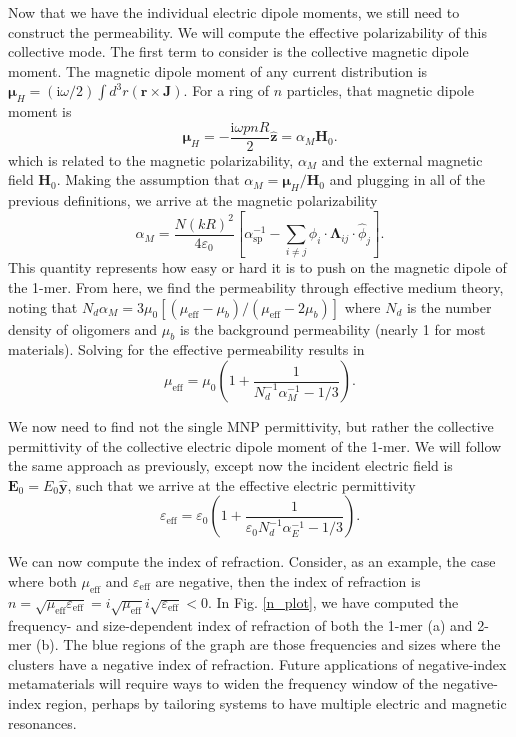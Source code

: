 \documentclass [11pt, proquest] {uwthesis}[2016/11/22]
\begin{document}
Now that we have the individual electric dipole moments, we still need to construct the permeability. We will compute the effective polarizability of this collective mode. The first term to consider is the collective magnetic dipole moment. The magnetic dipole moment of any current distribution is $\boldsymbol{\mu}_H = (\textrm{i}\omega/2)\int d^3r(\textbf{r}\times\textbf{J})$. For a ring of $n$ particles, that magnetic dipole moment is
\begin{equation}
\boldsymbol{\mu}_H = -\frac{\textrm{i}\omega pnR}{2}\hat{\textbf{z}} = \alpha_{M}\textbf{H}_0.
\label{mag_dip_1}
\end{equation}
which is related to the magnetic polarizability, $\alpha_M$ and the external magnetic field $\textbf{H}_0$. Making the assumption that $\alpha_M = \boldsymbol{\mu}_H/\textbf{H}_0$ and plugging in all of the previous definitions, we arrive at the magnetic polarizability
\begin{equation}
\alpha_M = \frac{N(kR)^2}{4\varepsilon_0}\left[\alpha_{\textrm{sp}}^{-1} - \sum_{i\neq j} \hat{\phi}_i\cdot\boldsymbol{\Lambda}_{ij}\cdot\hat{\phi}_j\right].
\label{alpha_mag}
\end{equation}
This quantity represents how easy or hard it is to push on the magnetic dipole of the 1-mer. From here, we find the permeability through effective medium theory, noting that $N_d\alpha_M = 3\mu_0[(\mu_{\textrm{eff}}-\mu_b)/(\mu_{\textrm{eff}}-2\mu_b)]$ where $N_d$ is the number density of oligomers and $\mu_b$ is the background permeability (nearly 1 for most materials). Solving for the effective permeability results in
\begin{equation}
\mu_{\textrm{eff}} = \mu_0\left(1+\frac{1}{N_d^{-1}\alpha_M^{-1}-1/3}\right).
\label{mu_eff}
\end{equation}

We now need to find not the single MNP permittivity, but rather the collective permittivity of the collective electric dipole moment of the 1-mer. We will follow the same approach as previously, except now the incident electric field is $\textbf{E}_0 = E_0\hat{\textbf{y}}$, such that we arrive at the effective electric permittivity
\begin{equation}
\varepsilon_{\textrm{eff}} = \varepsilon_0\left(1+\frac{1}{\varepsilon_0N_d^{-1}\alpha_E^{-1}-1/3}\right).
\label{eps_eff}
\end{equation}

We can now compute the index of refraction. Consider, as an example, the case where both $\mu_{\textrm{eff}}$ and $\varepsilon_{\textrm{eff}}$ are negative, then the index of refraction is $n = \sqrt{\mu_{\textrm{eff}}\varepsilon_{\textrm{eff}}} = i\sqrt{\mu_{\textrm{eff}}}i\sqrt{\varepsilon_{\textrm{eff}}} < 0$. In Fig. \ref{n_plot}, we have computed the frequency- and size-dependent index of refraction of both the 1-mer (a) and 2-mer (b). The blue regions of the graph are those frequencies and sizes where the clusters have a negative index of refraction. Future applications of negative-index metamaterials will require ways to widen the frequency window of the negative-index region, perhaps by tailoring systems to have multiple electric and magnetic resonances.
\end{document}
